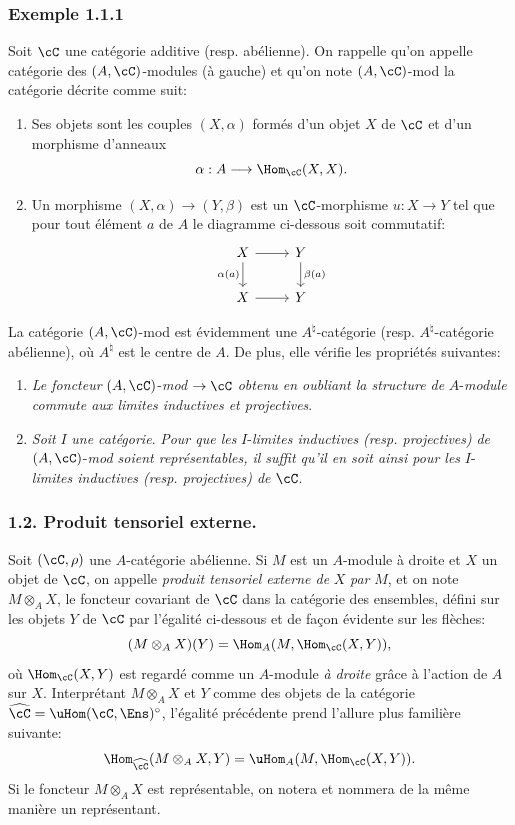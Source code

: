 \subsubsection*{Exemple 1.1.1}
Soit $\cC$ une catégorie additive (resp. abélienne). On rappelle qu'on appelle catégorie des $(A,\cC)$-modules (à gauche) et qu'on note $(A,\cC)$-mod la catégorie décrite comme suit:
\begin{enumerate}[label=(\roman*)]
\item Ses
objets sont les couples $(X,\alpha)$ formés d'un objet $X$ de $\cC$ et d'un morphisme d'anneaux
\[
\alpha:A\longrightarrow \Hom_{\cC}(X,X).
\]
\item Un morphisme $(X,\alpha)\to(Y,\beta)$ est un $\cC$-morphisme $u:X\to Y$ tel que pour tout élément $a$ de $A$ le diagramme ci-dessous soit commutatif:
\[
\begin{tikzcd}
X \arrow[r] \arrow[d,"\alpha(a)"'] & Y \arrow[d,"\beta(a)"]\\
X \arrow[r] & Y
\end{tikzcd}
\]
\end{enumerate}
La catégorie $(A,\cC)$-mod est évidemment une $A^{\natural}$-catégorie (resp. $A^{\natural}$-catégorie abélienne), où $A^{\natural}$ est le centre de $A$. De plus, elle vérifie les propriétés suivantes:
\begin{enumerate}[label=(\alph*)]
\item \emph{Le foncteur} $(A,\cC)$-\emph{mod} $\to\cC$ \emph{obtenu en oubliant la structure de} $A$-\emph{module commute aux limites inductives et projectives}.
\item \emph{Soit} $I$ \emph{une catégorie}. \emph{Pour que les} $I$-\emph{limites inductives} \emph{(resp. projectives)} \emph{de} $(A,\cC)$-\emph{mod soient représentables, il suffit qu'il en soit ainsi pour les} $I$-\emph{limites inductives (resp. projectives) de} $\cC$.
\end{enumerate}

\subsubsection*{1.2. Produit tensoriel externe.}
Soit $(\cC,\rho)$ une $A$-catégorie abélienne. Si $M$ est un $A$-module à droite et $X$ un objet de $\cC$, on appelle \emph{produit tensoriel externe de} $X$ \emph{par} $M$, et on note $M\otimes_A X$, le foncteur covariant de $\cC$ dans la catégorie des ensembles, défini sur les objets $Y$ de $\cC$ par l'égalité ci-dessous et de façon évidente sur les flèches:
\[
(M\otimes_A X)(Y)=\Hom_A(M,\Hom_{\cC}(X,Y)),
\]
où $\Hom_{\cC}(X,Y)$ est regardé comme un $A$-module \emph{à droite} grâce à l'action de $A$ sur $X$. Interprétant $M\otimes_AX$ et $Y$ comme des objets de la catégorie $\widehat{\cC}=\uHom(\cC,\Ens)^{\circ}$, l'égalité précédente prend l'allure plus familière
suivante:
\[
\Hom_{\widehat{\cC}}(M\otimes_A X,Y)=\uHom_A(M,\Hom_{\cC}(X,Y)).
\]
Si le foncteur $M\otimes_A X$ est représentable, on notera et nommera de la même manière un représentant.

